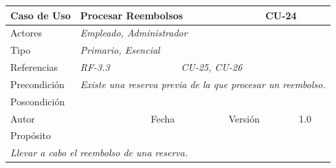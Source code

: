 \begin{table}[H]
    \begin{tabular}{|llllllll|}
    \hline
    \multicolumn{1}{|l|}{Caso de Uso}       & \multicolumn{5}{l|}{Procesar Reembolsos}                                                                          & \multicolumn{2}{l|}{\cellcolor[HTML]{E6E6E6}CU-24}          \\ \hline
    \multicolumn{1}{|l|}{Actores}           & \multicolumn{7}{l|}{{\color[HTML]{808080} \textit{Empleado, Administrador}}}                                                                                                                           \\ \hline
    \multicolumn{1}{|l|}{Tipo}              & \multicolumn{7}{l|}{{\color[HTML]{808080} \textit{Primario, Esencial}}}                                                                                                                \\ \hline
    \multicolumn{1}{|l|}{Referencias}       & \multicolumn{2}{l|}{{\color[HTML]{808080} \textit{RF-3.3}}}              & \multicolumn{5}{l|}{{\color[HTML]{808080} \textit{CU-25, CU-26}}}                                                                                       \\ \hline
    \multicolumn{1}{|l|}{Precondición}      & \multicolumn{7}{l|}{{\color[HTML]{808080} \textit{Existe una reserva previa de la que procesar un reembolso.}}}                                                                                                \\ \hline
    \multicolumn{1}{|l|}{Poscondición}      & \multicolumn{7}{l|}{}                                                                                                                                                                  \\ \hline
    \multicolumn{1}{|l|}{Autor}             & \multicolumn{1}{l|}{}                        & \multicolumn{2}{l|}{Fecha}           & \multicolumn{1}{l|}{}     & \multicolumn{2}{l|}{Versión}         & 1.0                           \\ \hline
    \multicolumn{8}{|l|}{\cellcolor[HTML]{F2F2F2}Propósito}                                                                                                                                                                          \\ \hline
    \multicolumn{8}{|p{15cm}|}{{\color[HTML]{808080} \textit{Llevar a cabo el reembolso de una reserva.}}}                                                                                                           \\ \hline

\end{tabular}
\end{table}
